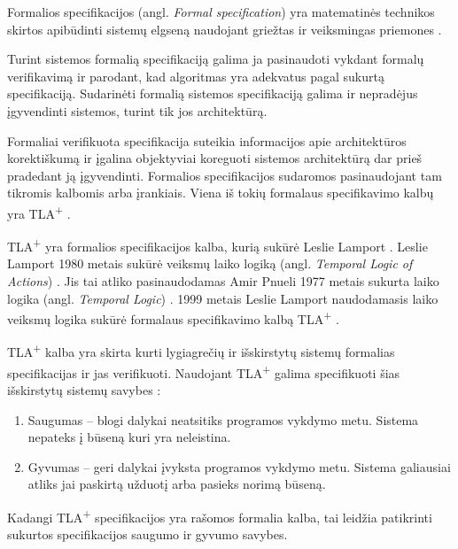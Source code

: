 \documentclass{VUMIFPSmagistrinis}
\begin{document}
        Formalios specifikacijos (angl. {\it Formal specification}) yra matematinės technikos skirtos apibūdinti sistemų elgseną naudojant griežtas ir veiksmingas priemones \cite{holzmann1995improvement}.
        
		Turint sistemos formalią specifikaciją galima ja pasinaudoti vykdant formalų verifikavimą ir parodant, kad algoritmas yra adekvatus pagal sukurtą specifikaciją.
		Sudarinėti formalią sistemos specifikaciją galima ir nepradėjus įgyvendinti sistemos, turint tik jos architektūrą. 
  
		Formaliai verifikuota specifikacija suteikia informacijos apie architektūros korektiškumą ir įgalina objektyviai koreguoti sistemos architektūrą dar prieš pradedant ją įgyvendinti.
		Formalios specifikacijos sudaromos pasinaudojant tam tikromis kalbomis arba įrankiais.
		Viena iš tokių formalaus specifikavimo kalbų yra TLA\textsuperscript{+} \cite{lamport2002specifying}.
		

		TLA\textsuperscript{+} yra formalios specifikacijos kalba, kurią sukūrė Leslie Lamport \cite{lamport2002specifying}.
		Leslie Lamport 1980 metais sukūrė veiksmų laiko logiką (angl. {\it Temporal Logic of Actions}) \cite{10.1145/177492.177726}. Jis tai atliko pasinaudodamas Amir Pnueli 1977 metais sukurta laiko logika (angl. {\it Temporal Logic}) \cite{4567924}.
		1999 metais Leslie Lamport naudodamasis laiko veiksmų logika sukūrė formalaus specifikavimo kalbą TLA\textsuperscript{+} \cite{lamport2002specifying}.
		

        TLA\textsuperscript{+} kalba yra skirta kurti lygiagrečių ir išskirstytų sistemų formalias specifikacijas ir jas verifikuoti.
		Naudojant TLA\textsuperscript{+} galima specifikuoti šias išskirstytų sistemų savybes \cite{lamport2019safety}:
  
		\begin{enumerate}
                \item{Saugumas -- blogi dalykai neatsitiks programos vykdymo metu. Sistema nepateks į būseną kuri yra neleistina.}
			\item{Gyvumas -- geri dalykai įvyksta programos vykdymo metu. Sistema galiausiai atliks jai paskirtą užduotį arba pasieks norimą būseną.}
		\end{enumerate}
  
		Kadangi TLA\textsuperscript{+} specifikacijos yra rašomos formalia kalba, tai leidžia patikrinti sukurtos specifikacijos saugumo ir gyvumo savybes.
\end{document}

